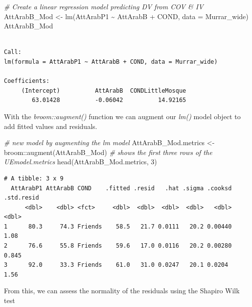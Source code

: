\documentclass[
  11pt,
]{book}
\newenvironment{Shaded}{\begin{snugshade}}{\end{snugshade}}
\newcommand{\AttributeTok}[1]{\textcolor[rgb]{0.77,0.63,0.00}{#1}}
\newcommand{\CommentTok}[1]{\textcolor[rgb]{0.56,0.35,0.01}{\textit{#1}}}
\newcommand{\DecValTok}[1]{\textcolor[rgb]{0.00,0.00,0.81}{#1}}
\newcommand{\FunctionTok}[1]{\textcolor[rgb]{0.00,0.00,0.00}{#1}}
\newcommand{\NormalTok}[1]{#1}
\newcommand{\OtherTok}[1]{\textcolor[rgb]{0.56,0.35,0.01}{#1}}
\newcommand{\SpecialCharTok}[1]{\textcolor[rgb]{0.00,0.00,0.00}{#1}}
\begin{document}
\begin{Shaded}
\begin{Highlighting}[]
\CommentTok{\# Create a linear regression model predicting DV from COV \& IV}
\NormalTok{AttArabB\_Mod }\OtherTok{\textless{}{-}} \FunctionTok{lm}\NormalTok{(AttArabP1 }\SpecialCharTok{\textasciitilde{}}\NormalTok{ AttArabB }\SpecialCharTok{+}\NormalTok{ COND, }\AttributeTok{data =}\NormalTok{ Murrar\_wide)}
\NormalTok{AttArabB\_Mod}
\end{Highlighting}
\end{Shaded}

\begin{verbatim}

Call:
lm(formula = AttArabP1 ~ AttArabB + COND, data = Murrar_wide)

Coefficients:
     (Intercept)          AttArabB  CONDLittleMosque  
        63.01428          -0.06042          14.92165  
\end{verbatim}

With the \emph{broom::augment()} function we can augment our \emph{lm()} model object to add fitted values and residuals.

\begin{Shaded}
\begin{Highlighting}[]
\CommentTok{\# new model by augmenting the lm model}
\NormalTok{AttArabB\_Mod.metrics }\OtherTok{\textless{}{-}}\NormalTok{ broom}\SpecialCharTok{::}\FunctionTok{augment}\NormalTok{(AttArabB\_Mod)}
\CommentTok{\# shows the first three rows of the UEmodel.metrics}
\FunctionTok{head}\NormalTok{(AttArabB\_Mod.metrics, }\DecValTok{3}\NormalTok{)}
\end{Highlighting}
\end{Shaded}

\begin{verbatim}
# A tibble: 3 x 9
  AttArabP1 AttArabB COND    .fitted .resid   .hat .sigma .cooksd .std.resid
      <dbl>    <dbl> <fct>     <dbl>  <dbl>  <dbl>  <dbl>   <dbl>      <dbl>
1      80.3     74.3 Friends    58.5   21.7 0.0111   20.2 0.00440      1.08 
2      76.6     55.8 Friends    59.6   17.0 0.0116   20.2 0.00280      0.845
3      92.0     33.3 Friends    61.0   31.0 0.0247   20.1 0.0204       1.56 
\end{verbatim}

From this, we can assess the normality of the residuals using the Shapiro Wilk test

\begin{Shaded}
\end{Shaded}
\end{document}
